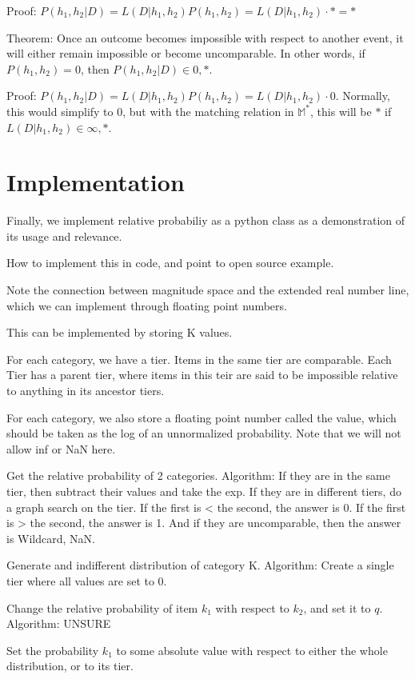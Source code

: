 \documentclass[twoside]{article}
\begin{document}
Proof: \(P(h_1, h_2|D) = L(D|h_1, h_2) P(h_1, h_2) = L(D|h_1, h_2) \cdot \ast = \ast\)

Theorem: Once an outcome becomes impossible with respect to another event, it will either remain impossible or become uncomparable. In other words,  if \(P(h_1, h_2)=0\), then \(P(h_1, h_2|D) \in {0, \ast}\).

Proof: \(P(h_1, h_2|D) = L(D|h_1, h_2) P(h_1, h_2) = L(D|h_1, h_2) \cdot 0\). Normally, this would simplify to 0, but with the matching relation in \(\mathbb{M}^*\), this will be \(\ast\) if \(L(D|h_1, h_2) \in {\infty, \ast}\).

\section{Implementation}

Finally, we implement relative probabiliy as a python class as a demonstration of its usage and relevance.

How to implement this in code, and point to open source example.

Note the connection between magnitude space and the extended real number line, which we can implement through floating point numbers.

This can be implemented by storing K values.

For each category, we have a tier. Items in the same tier are comparable. Each Tier has a parent tier, where items in this teir are said to be impossible relative to anything in its ancestor tiers.

For each category, we also store a floating point number called the value, which should be taken as the log of an unnormalized probability. Note that we will not allow inf or NaN here.

Get the relative probability of 2 categories. Algorithm: If they are in the same tier, then subtract their values and take the exp. If they are in different tiers, do a graph search on the tier. If the first is < the second, the answer is 0. If the first is > the second, the answer is 1. And if they are uncomparable, then the answer is Wildcard, NaN.

Generate and indifferent distribution of category K. Algorithm: Create a single tier where all values are set to 0.

Change the relative probability of item \(k_1\) with respect to \(k_2\), and set it to \(q\). Algorithm: UNSURE

Set the probability \(k_1\) to some absolute value with respect to either the whole distribution, or to its tier.
\end{document}
